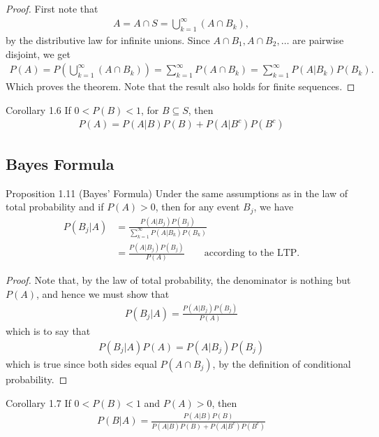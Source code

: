 \begin{proof}
First note that
\begin{align*}
    A = A \cap S = \bigcup_{k = 1}^\infty (A \cap B_k),
\end{align*}
by the distributive law for infinite unions. Since $A \cap B_1, A \cap B_2, \ldots$ are pairwise disjoint,  we get
\begin{align*}
    P(A) = P \left(\bigcup_{k = 1}^\infty (A \cap B_k)\right) = \sum_{k = 1}^\infty P(A \cap B_k) = \sum_{k = 1}^\infty P(A|B_k)P(B_k).
\end{align*}
Which proves the theorem. Note that the result also holds for finite sequences.
\end{proof}

\begin{boks}{Corollary 1.6}
If $0 < P(B) < 1$, for $B\subseteq S$, then
\begin{align*}
    P(A) = P(A|B)P(B) + P(A|B^c)P(B^c)
\end{align*}
\end{boks}

\subsection{Bayes Formula}
\begin{boks}{Proposition 1.11 (Bayes' Formula)}
Under the same assumptions as in the law of total probability and if $P(A) > 0$, then for any event $B_j$, we have
\begin{align*}
    P(B_j|A) &= \frac{P(A|B_j)P(B_j)}{\sum_{k=1}^\infty P(A|B_k)P(B_k)} \\
    &= \frac{P(A|B_j)P(B_j)}{P(A)} \qquad \text{according to the LTP.}
\end{align*}
\end{boks}
\begin{proof}
  Note that, by the law of total probability, the denominator is nothing but $P(A)$, and hence we must show that
  \begin{align*}
    P(B_j|A) = \frac{P(A|B_j)P(B_j)}{P(A)}
  \end{align*}
  which is to say that
  \begin{align*}
    P(B_j|A)P(A) = P(A|B_j)P(B_j)
  \end{align*}
  which is true since both sides equal $P(A \cap B_j)$, by the definition of conditional probability.
\end{proof}

\begin{boks}{Corollary 1.7}
  If $0 < P(B) < 1$ and $P(A) > 0$, then
  \begin{align*}
    P(B|A) = \frac{P(A|B)P(B)}{P(A|B)P(B) + P(A|B^c)P(B^c)}
  \end{align*}
\end{boks}
